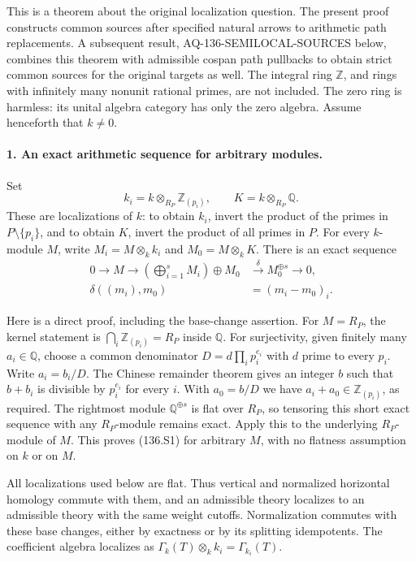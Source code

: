 This is a theorem about the original localization question.
The present proof constructs common sources after specified
natural arrows to arithmetic path replacements. A subsequent
result, AQ-136-SEMILOCAL-SOURCES below, combines this theorem
with admissible cospan path pullbacks to obtain strict common
sources for the original targets as well. The integral ring $\mathbb Z$, and rings
with infinitely many nonunit rational primes, are not included.
The zero ring is harmless: its unital algebra category has
only the zero algebra. Assume henceforth that $k\ne0$.

\paragraph{1. An exact arithmetic sequence for arbitrary modules.}
Set
\[
 k_i=k\otimes_{R_P}\mathbb Z_{(p_i)},\qquad
 K=k\otimes_{R_P}\mathbb Q.
\]
These are localizations of $k$: to obtain $k_i$, invert the
product of the primes in $P\setminus\{p_i\}$, and to obtain
$K$, invert the product of all primes in $P$.
For every $k$-module $M$, write $M_i=M\otimes_k k_i$ and
$M_0=M\otimes_k K$. There is an exact sequence
\begin{equation}
 \begin{aligned}
 0\longrightarrow M\longrightarrow
       \left(\bigoplus_{i=1}^sM_i\right)\oplus M_0
   &\xrightarrow{\delta} M_0^{\oplus s}\longrightarrow0,\\
 \delta((m_i),m_0)&=(m_i-m_0)_i.
 \end{aligned}                                           \tag{136.S1}
\end{equation}

Here is a direct proof, including the base-change assertion.
For $M=R_P$, the kernel statement is
$\bigcap_i\mathbb Z_{(p_i)}=R_P$ inside $\mathbb Q$.
For surjectivity, given finitely many $a_i\in\mathbb Q$,
choose a common denominator
$D=d\prod_i p_i^{e_i}$ with $d$ prime to every $p_i$.
Write $a_i=b_i/D$. The Chinese remainder theorem gives an
integer $b$ such that $b+b_i$ is divisible by $p_i^{e_i}$
for every $i$. With $a_0=b/D$ we have
$a_i+a_0\in\mathbb Z_{(p_i)}$, as required.
The rightmost module $\mathbb Q^{\oplus s}$ is flat over
$R_P$, so tensoring this short exact sequence with any
$R_P$-module remains exact. Apply this to the underlying
$R_P$-module of $M$. This proves (136.S1) for arbitrary
$M$, with no flatness assumption on $k$ or on $M$.

All localizations used below are flat. Thus vertical and
normalized horizontal homology commute with them, and an
admissible theory localizes to an admissible theory with
the same weight cutoffs. Normalization commutes with these
base changes, either by exactness or by its splitting
idempotents. The coefficient algebra localizes as
$\Gamma_k(T)\otimes_k k_i=\Gamma_{k_i}(T)$.

